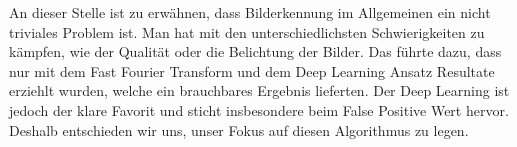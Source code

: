 An dieser Stelle ist zu erwähnen, dass Bilderkennung im Allgemeinen ein nicht triviales Problem ist. Man hat mit den unterschiedlichsten Schwierigkeiten zu kämpfen, wie der Qualität oder die Belichtung der Bilder. Das führte dazu, dass nur mit dem Fast Fourier Transform und dem Deep Learning Ansatz Resultate erziehlt wurden, welche ein brauchbares Ergebnis lieferten. Der Deep Learning ist jedoch der klare Favorit und sticht insbesondere beim False Positive Wert hervor. Deshalb entschieden wir uns, unser Fokus auf diesen Algorithmus zu legen. 



